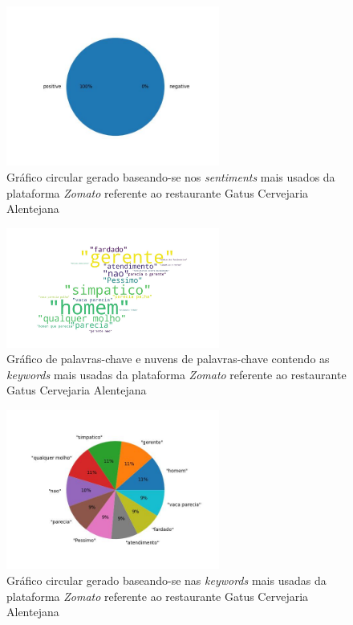 \begin{figure}[!htb]
\centering
\includegraphics[width=7cm]{figuras/Zomato/Restaurants/restaurante12_sentiments.jpeg}
\caption{Gráfico circular gerado baseando-se nos \textit{sentiments} mais usados da plataforma \textit{Zomato} referente ao restaurante Gatus Cervejaria Alentejana}
\label{fig:exemplofig}
\end{figure}

\begin{figure}[!htb]
\centering
\includegraphics[width=7cm]{figuras/Zomato/Restaurants/restaurante12_keywordcloud.jpeg}
\caption{Gráfico de palavras-chave e nuvens de palavras-chave contendo as \textit{keywords} mais usadas da plataforma \textit{Zomato} referente ao restaurante Gatus Cervejaria Alentejana}
\label{fig:exemplofig}
\end{figure}

\begin{figure}[!htb]
\centering
\includegraphics[width=7cm]{figuras/Zomato/Restaurants/restaurante12_keywords.jpeg}
\caption{Gráfico circular gerado baseando-se nas \textit{keywords} mais usadas da plataforma \textit{Zomato} referente ao restaurante Gatus Cervejaria Alentejana}
\label{fig:exemplofig}
\end{figure}

